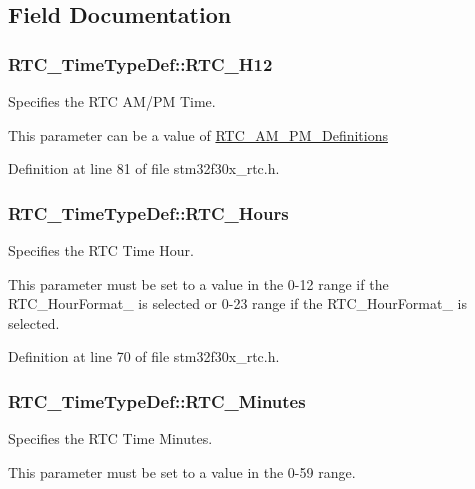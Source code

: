 \subsection{Field Documentation}
\hypertarget{struct_r_t_c___time_type_def_ae55dcfa804d1c40f8981b5b314f65065}{
\subsubsection[{R\-T\-C\-\_\-\-H12}]{ R\-T\-C\-\_\-\-Time\-Type\-Def\-::\-R\-T\-C\-\_\-\-H12}}\label{struct_r_t_c___time_type_def_ae55dcfa804d1c40f8981b5b314f65065}
\begin{DoxyVerb}           Specifies the RTC AM/PM Time.
\end{DoxyVerb}
 This parameter can be a value of \hyperlink{group___r_t_c___a_m___p_m___definitions}{R\-T\-C\-\_\-\-A\-M\-\_\-\-P\-M\-\_\-\-Definitions} 

Definition at line 81 of file stm32f30x\-\_\-rtc.\-h.

\hypertarget{struct_r_t_c___time_type_def_a9ff1221096e27f89f3b4f645ca374221}{
\subsubsection[{R\-T\-C\-\_\-\-Hours}]{ R\-T\-C\-\_\-\-Time\-Type\-Def\-::\-R\-T\-C\-\_\-\-Hours}}\label{struct_r_t_c___time_type_def_a9ff1221096e27f89f3b4f645ca374221}
\begin{DoxyVerb}         Specifies the RTC Time Hour.
\end{DoxyVerb}
 This parameter must be set to a value in the 0-\/12 range if the R\-T\-C\-\_\-\-Hour\-Format\-\_ is selected or 0-\/23 range if the R\-T\-C\-\_\-\-Hour\-Format\-\_ is selected. 

Definition at line 70 of file stm32f30x\-\_\-rtc.\-h.

\hypertarget{struct_r_t_c___time_type_def_ad61e54d493464c02992ba18045c48cad}{
\subsubsection[{R\-T\-C\-\_\-\-Minutes}]{ R\-T\-C\-\_\-\-Time\-Type\-Def\-::\-R\-T\-C\-\_\-\-Minutes}}\label{struct_r_t_c___time_type_def_ad61e54d493464c02992ba18045c48cad}
\begin{DoxyVerb}       Specifies the RTC Time Minutes.
\end{DoxyVerb}
 This parameter must be set to a value in the 0-\/59 range. 

